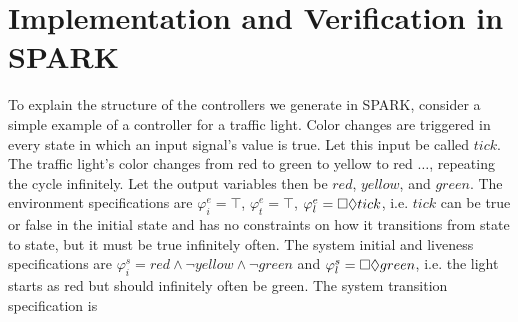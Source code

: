\documentclass[runningheads]{llncs}
\begin{document}
\section{Implementation and Verification in SPARK}
\label{sec:implementation}

To explain the structure of the controllers we generate in SPARK, consider a simple example of a controller for a traffic light. 
Color changes are triggered in every state in which an input signal's value is true.
Let this input be called $tick$.
The traffic light's color changes from red to green to yellow to red $\ldots$, repeating the cycle infinitely. 
Let the output variables then be $red$, $yellow$, and $green$.
The environment specifications are $\varphi^e_i = \top$, $\varphi^e_t = \top$, $\varphi^e_l = \square \lozenge tick$, i.e.  
$tick$ can be true or false in the initial state and has no constraints on how it transitions from state to state, but it must be true infinitely often.
The system initial and liveness specifications are $\varphi^s_i = red \land \lnot yellow \land \lnot green$ and $\varphi^s_l =  \square \lozenge green$, i.e.
the light starts as red but should infinitely often be green. The system transition specification is
\end{document}
